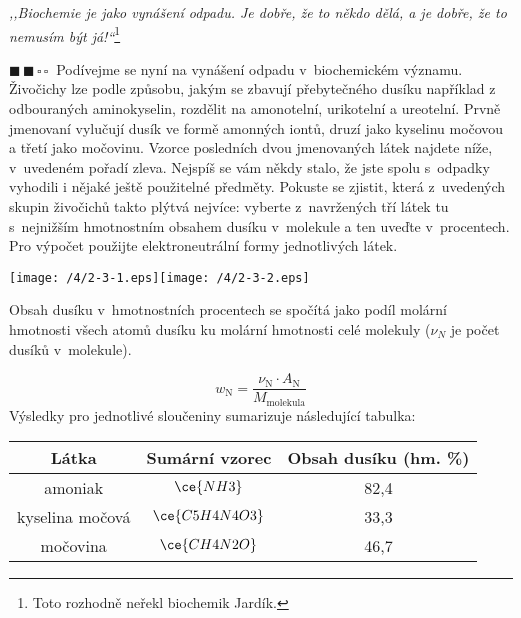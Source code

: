 \documentclass{book}
\newcommand{\dva}{$\blacksquare \, \blacksquare \, \square \, \square \; \; $}
\renewenvironment{quotation}{\par}{\par} %
\begin{document}
\hrulefill %
\begin{quotation}

\textit{,,Biochemie je jako vynášení odpadu. Je dobře, že to někdo
dělá, a je dobře, že to nemusím být já!``}\footnote{Toto rozhodně neřekl biochemik Jardík.} 

\dva Podívejme se nyní na vynášení odpadu v~biochemickém významu. Živočichy
lze podle způsobu, jakým se zbavují přebytečného dusíku například
z odbouraných aminokyselin, rozdělit na amonotelní, urikotelní a ureotelní.
Prvně jmenovaní vylučují dusík ve formě amonných iontů, druzí jako
kyselinu močovou a třetí jako močovinu. Vzorce posledních dvou jmenovaných
látek najdete níže, v~uvedeném pořadí zleva. Nejspíš se vám někdy
stalo, že jste spolu s~odpadky vyhodili i nějaké ještě použitelné
předměty. Pokuste se zjistit, která z~uvedených skupin živočichů takto
plýtvá nejvíce: vyberte z~navržených tří látek tu s~nejnižším hmotnostním
obsahem dusíku v~molekule a ten uveďte v~procentech. Pro výpočet použijte
elektroneutrální formy jednotlivých látek.
\begin{center}

\texttt{[image: /4/2-3-1.eps]}\texttt{[image: /4/2-3-2.eps]}

\par\end{center}

\end{quotation} \dotfill \par 
Obsah dusíku v~hmotnostních procentech se spočítá jako podíl molární
hmotnosti všech atomů dusíku ku molární hmotnosti celé molekuly ($\nu_{N}$
je počet dusíků v~molekule).

\[
w_{\mathrm{N}}=\frac{\nu_{\mathrm{N}}\cdot A_{\mathrm{N}}}{M_{\mathrm{molekula}}}
\]
Výsledky pro jednotlivé sloučeniny sumarizuje následující tabulka:
\noindent \begin{center}
\begin{tabular}{c|c|c}

Látka & Sumární vzorec & Obsah dusíku (hm. \%)\tabularnewline
\hline 
\hline 
amoniak & $\ce{NH3}$ & 82,4\tabularnewline
\hline 
kyselina močová & $\ce{C5H4N4O3}$ & 33,3\tabularnewline
\hline 
močovina & $\ce{CH4N2O}$ & 46,7\tabularnewline

\end{tabular}
\par\end{center}
\end{document}
